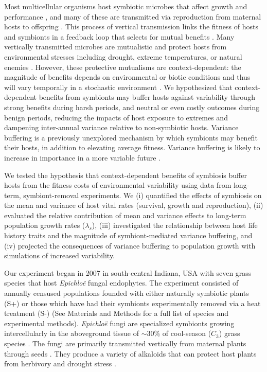 \documentclass[12pt]{article}
\begin{document}
Most multicellular organisms host symbiotic microbes that affect growth and performance \cite{rodriguez2009fungal,mcfall2013animals}, and many of these are transmitted via reproduction from maternal hosts to offspring \cite{funkhouser2013mom}.
This process of vertical transmission links the fitness of hosts and symbionts in a feedback loop that selects for mutual benefits \cite{ewald1987transmission,fine1975vectors}.
Many vertically transmitted microbes are mutualistic and protect hosts from environmental stresses including drought, extreme temperatures, or natural enemies \cite{russell2006costs,brownlie2009symbiont,kivlin2013fungal,corbin2017heritable,hoadley2019host}. 
However, these protective mutualisms are context-dependent: the magnitude of benefits depends on environmental or biotic conditions \cite{chamberlain2014context} and thus will vary temporally in a stochastic environment \cite{jordano1994spatial,billick2003relative}.
We hypothesized that context-dependent benefits from symbionts may buffer hosts against variability through strong benefits during harsh periods, and neutral or even costly outcomes during benign periods, reducing the impacts of host exposure to extremes and dampening inter-annual variance relative to non-symbiotic hosts.
Variance buffering is a previously unexplored mechanism by which symbionts may benefit their hosts, in addition to elevating average fitness. Variance buffering is likely to increase in importance in a more variable future \cite{rudgers2020climate}.

We tested the hypothesis that context-dependent benefits of symbiosis buffer hosts from the fitness costs of environmental variability using data from long-term, symbiont-removal experiments. 
We  (i) quantified the effects of symbiosis on the mean and variance of host vital rates (survival, growth and reproduction), (ii) evaluated the relative contribution of mean and variance effects to long-term population growth rates ($\lambda_s$), (iii) investigated the relationship between host life history traits and the magnitude of symbiont-mediated variance buffering, and (iv) projected the consequences of variance buffering to population growth with simulations of increased variability.

Our experiment began in 2007 in south-central Indiana, USA with seven grass species that host \emph{Epichlo\"{e}} fungal endophytes. The experiment consisted of annually censused populations founded with either naturally symbiotic plants (S+) or those which have had their symbionts experimentally removed  via a heat treatment (S-) (See Materials and Methods for a full list of species and experimental methods).
\emph{Epichlo\"{e}} fungi are specialized symbionts growing intercellularly in the aboveground tissue of  $\sim30$\% of cool-season ($C_{3}$) grass species \cite{leuchtmann1992systematics}.
The fungi are primarily transmitted vertically from maternal plants through seeds \cite{cheplick2009ecology,rudgers2009fungus}.
They produce a variety of alkaloids that can protect host plants from herbivory \cite{brem2001epichloe} and drought stress \cite{cheplick2004recovery,kannadan2008endophyte,decunta2021systematic}.
\end{document}
